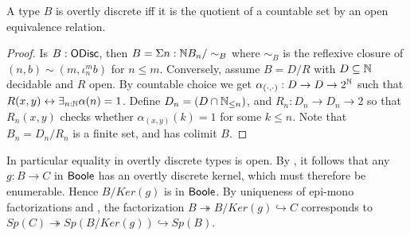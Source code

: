 
\begin{lemma}
  A type $B$ is overtly discrete iff it is the quotient of a countable set by an open equivalence relation. 
\end{lemma}
\begin{proof}
  Is $B:\mathsf{ODisc}$, then $B= \Sigma{n:\mathbb{N}} B_n/\sim_B$ where $\sim_B$ is the reflexive closure of  
  $(n,b)\sim(m,\iota_n^m b)$ for $n\leq m$. 
%
  Conversely, assume $B= D/R$ with $D\subseteq \mathbb{N}$ decidable and $R$ open. 
  By countable choice we get $\alpha_{(\cdot,\cdot)}:D \to D \to 2^{\mathbb{N}}$ such that 
  $R(x,y)\leftrightarrow \exists_{n:\mathbb{N}}\alpha(n) = 1$. 
  Define $D_n = (D \cap \mathbb{N}_{\leq n})$, and $R_n : D_n \to D_n \to 2$ so that $R_n(x,y)$ checks whether
  $\alpha_{(x,y)}(k) =1$ for some $k\leq n$. 
  Note that $B_n = D_n/R_n$ is a finite set, and has colimit $B$. 
\end{proof}
\begin{remark}\label{BooleEpiMono}
  In particular equality in overtly discrete types is open. 
  By , it follows that any $g:B\to C$ in $\mathsf{Boole}$ has an overtly discrete kernel, 
  which must therefore be enumerable. Hence $B/Ker(g)$ is in $\mathsf{Boole}$. 
  By uniqueness of epi-mono factorizations and , the factorization 
  $B\twoheadrightarrow B/Ker(g) \hookrightarrow C$ corresponds to 
  $Sp(C) \twoheadrightarrow Sp(B/Ker(g)) \hookrightarrow Sp(B)$. 
\end{remark}


